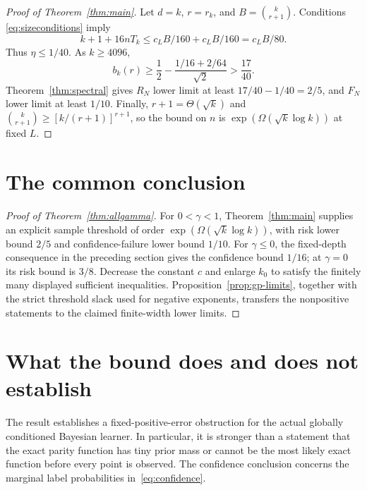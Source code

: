 \documentclass[11pt]{article}
\theoremstyle{remark}\newtheorem{remark}[theorem]{Remark}
\begin{document}
\begin{proof}[Proof of Theorem~\ref{thm:main}]
Let $d=k$, $r=r_k$, and $B=\binom{k}{r+1}$. Conditions
\eqref{eq:sizeconditions} imply
\[
 k+1+16nT_k\le c_LB/160+c_LB/160=c_LB/80.
\]
Thus $\eta\le1/40$. As $k\ge4096$,
\[
 b_k(r)\ge\frac12-\frac{1/16+2/64}{\sqrt2}
          >\frac{17}{40}.
\]
Theorem~\ref{thm:spectral} gives $R_N$ lower limit at least
$17/40-1/40=2/5$, and $F_N$ lower limit at least $1/10$.
Finally, $r+1=\Theta(\sqrt{k})$ and
$\binom{k}{r+1}\ge[k/(r+1)]^{r+1}$, so the bound on $n$ is
$\exp(\Omega(\sqrt{k}\log k))$ at fixed $L$.
\end{proof}



\section{The common conclusion}\label{sec:allgamma-proof}
\begin{proof}[Proof of Theorem~\ref{thm:allgamma}]
For $0<\gamma<1$, Theorem~\ref{thm:main} supplies an explicit
sample threshold of order $\exp(\Omega(\sqrt{k}\log k))$, with
risk lower bound $2/5$ and confidence-failure lower bound $1/10$.
For $\gamma\le0$, the fixed-depth consequence in the preceding
section gives the confidence bound $1/16$; at $\gamma=0$ its
risk bound is $3/8$. Decrease the constant $c$ and enlarge $k_0$
to satisfy the finitely many displayed sufficient inequalities.
Proposition~\ref{prop:gp-limits}, together with the strict threshold
slack used for negative exponents, transfers the nonpositive
statements to the claimed finite-width lower limits.
\end{proof}

\section{What the bound does and does not establish}
The result establishes a fixed-positive-error obstruction for the
actual globally conditioned Bayesian learner. In particular, it is
stronger than a statement that the exact parity function has tiny
prior mass or cannot be the most likely exact function before every
point is observed. The confidence conclusion concerns the marginal
label probabilities in~\eqref{eq:confidence}.
\end{document}
